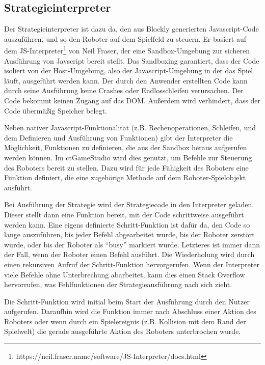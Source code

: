 \subsection{Strategieinterpreter}

Der Strategieinterpreter ist dazu da, den aus Blockly generierten Javascript-Code auszuführen, und
so den Roboter auf dem Spielfeld zu steuern. Er basiert auf dem
JS-Interpreter\footnote{https://neil.fraser.name/software/JS-Interpreter/docs.html} von Neil Fraser,
der eine Sandbox-Umgebung zur sicheren Ausführung von Javscript bereit stellt. Das Sandboxing
garantiert, dass der Code isoliert von der Host-Umgebung, also der Javascript-Umgebung in der das
Spiel läuft, ausgeführt werden kann. Der durch den Anwender erstellten Code kann durch seine
Ausführung keine Crashes oder Endlosschleifen verursachen. Der Code bekommt keinen Zugang auf das
DOM. Außerdem wird verhindert, dass der Code übermäßig Speicher belegt.

Neben nativer Javascript-Funktionalität (z.B. Rechenoperationen, Schleifen, und dem Definieren und
Ausführung von Funktionen) gibt der Interpreter die Möglichkeit, Funktionen zu definieren, die aus
der Sandbox heraus aufgerufen werden können. Im ctGameStudio wird dies genutzt, um Befehle zur
Steuerung des Roboters bereit zu stellen. Dazu wird für jede Fähigkeit des Roboters eine Funktion
definiert, die eine zugehörige Methode auf dem Roboter-Spielobjekt ausführt.

Bei Ausführung der Strategie wird der Strategiecode in den Interpreter geladen. Dieser stellt dann
eine Funktion bereit, mit der Code schrittweise ausgeführt werden kann. Eine eigens definierte
Schritt-Funktion ist dafür da, den Code so lange auszuführen, bis jeder Befehl abgearbeitet wurde,
bis der Roboter zerstört wurde, oder bis der Roboter als \enquote{busy} markiert wurde. Letzteres
ist immer dann der Fall, wenn der Roboter einen Befehl ausführt. Die Wiederholung wird durch einen
rekursiven Aufruf der Schritt-Funktion hervorgerufen. Wenn der Interpreter viele Befehle ohne
Unterbrechung abarbeitet, kann dies einen Stack Overflow hervorrufen, was Fehlfunktionen der
Strategieausführung nach sich zieht.

Die Schritt-Funktion wird initial beim Start der Ausführung durch den Nutzer aufgerufen. Daraufhin
wird die Funktion immer nach Abschluss einer Aktion des Roboters oder wenn durch ein Spielereignis
(z.B. Kollision mit dem Rand der Spielwelt) die gerade ausgeführte Aktion des Roboters unterbrochen
wurde.

